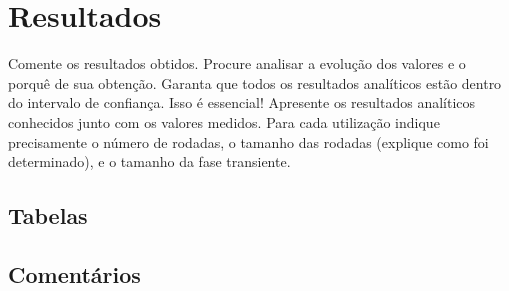 \chapter{Resultados}
Comente os resultados obtidos. Procure analisar a evolução dos valores e o porquê de sua
obtenção. Garanta que todos os resultados analíticos estão dentro do intervalo de confiança.
Isso é essencial! Apresente os resultados analíticos conhecidos junto com os valores
medidos.
Para cada utilização indique precisamente o número de rodadas, o tamanho das rodadas
(explique como foi determinado), e o tamanho da fase transiente.



\section{Tabelas}
\section{Comentários}
